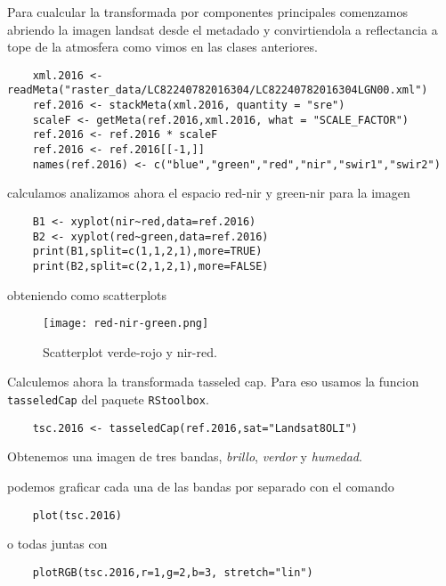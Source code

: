 \begin{exa}
    Para cualcular la transformada por componentes principales comenzamos
    abriendo la imagen landsat desde el metadado y convirtiendola a reflectancia
    a tope de la atmosfera como vimos en las clases anteriores.
    \begin{lstlisting}
    xml.2016 <- readMeta("raster_data/LC82240782016304/LC82240782016304LGN00.xml")
    ref.2016 <- stackMeta(xml.2016, quantity = "sre")
    scaleF <- getMeta(ref.2016,xml.2016, what = "SCALE_FACTOR")
    ref.2016 <- ref.2016 * scaleF
    ref.2016 <- ref.2016[[-1,]]
    names(ref.2016) <- c("blue","green","red","nir","swir1","swir2")
    \end{lstlisting}
    calculamos analizamos ahora el espacio red-nir y green-nir para la imagen

    \begin{lstlisting}
    B1 <- xyplot(nir~red,data=ref.2016)
    B2 <- xyplot(red~green,data=ref.2016)
    print(B1,split=c(1,1,2,1),more=TRUE)
    print(B2,split=c(2,1,2,1),more=FALSE)
    \end{lstlisting}

    obteniendo como scatterplots

    \begin{figure}[h!]
    \begin{center}
        \texttt{[image: red-nir-green.png]}
    \end{center}
    \caption{Scatterplot verde-rojo y nir-red.}
    \label{fig:green-red}
    \end{figure}

    Calculemos ahora la transformada tasseled cap. Para eso usamos la funcion
    \texttt{tasseledCap} del paquete \texttt{RStoolbox}.
    \begin{lstlisting}
    tsc.2016 <- tasseledCap(ref.2016,sat="Landsat8OLI")
    \end{lstlisting}
    Obtenemos una imagen de tres bandas, \emph{brillo}, \emph{verdor} y
    \emph{humedad}.

    podemos graficar cada una de las bandas por separado con el comando

    \begin{lstlisting}
    plot(tsc.2016)
    \end{lstlisting}

    o todas juntas con

    \begin{lstlisting}
    plotRGB(tsc.2016,r=1,g=2,b=3, stretch="lin")
    \end{lstlisting}


\end{exa}
